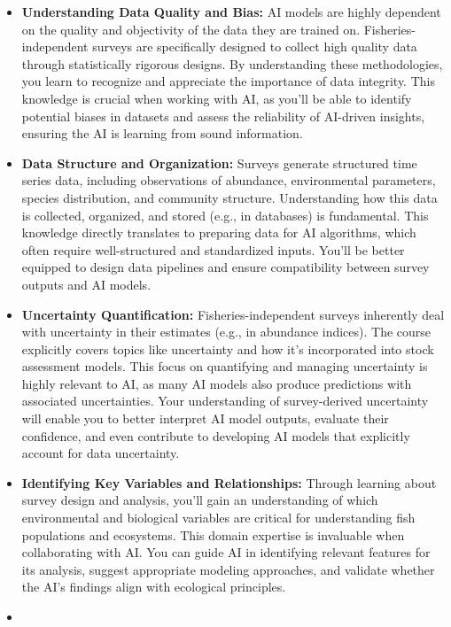 \documentclass[
  letterpaper,
  oneside,
  open=any]{scrbook}
\providecommand{\tightlist}{%
  \setlength{\itemsep}{0pt}\setlength{\parskip}{0pt}}\usepackage{longtable,booktabs,array}
\begin{document}
\begin{itemize}
\tightlist
\item
  \textbf{Understanding Data Quality and Bias:} AI models are highly
  dependent on the quality and objectivity of the data they are trained
  on. Fisheries-independent surveys are specifically designed to collect
  high quality data through statistically rigorous designs. By
  understanding these methodologies, you learn to recognize and
  appreciate the importance of data integrity. This knowledge is crucial
  when working with AI, as you'll be able to identify potential biases
  in datasets and assess the reliability of AI-driven insights, ensuring
  the AI is learning from sound information.
\item
  \textbf{Data Structure and Organization:} Surveys generate structured
  time series data, including observations of abundance, environmental
  parameters, species distribution, and community structure.
  Understanding how this data is collected, organized, and stored (e.g.,
  in databases) is fundamental. This knowledge directly translates to
  preparing data for AI algorithms, which often require well-structured
  and standardized inputs. You'll be better equipped to design data
  pipelines and ensure compatibility between survey outputs and AI
  models.
\item
  \textbf{Uncertainty Quantification:} Fisheries-independent surveys
  inherently deal with uncertainty in their estimates (e.g., in
  abundance indices). The course explicitly covers topics like
  uncertainty and how it's incorporated into stock assessment models.
  This focus on quantifying and managing uncertainty is highly relevant
  to AI, as many AI models also produce predictions with associated
  uncertainties. Your understanding of survey-derived uncertainty will
  enable you to better interpret AI model outputs, evaluate their
  confidence, and even contribute to developing AI models that
  explicitly account for data uncertainty.
\item
  \textbf{Identifying Key Variables and Relationships:} Through learning
  about survey design and analysis, you'll gain an understanding of
  which environmental and biological variables are critical for
  understanding fish populations and ecosystems. This domain expertise
  is invaluable when collaborating with AI. You can guide AI in
  identifying relevant features for its analysis, suggest appropriate
  modeling approaches, and validate whether the AI's findings align with
  ecological principles.
\item

\end{itemize}
\end{document}
